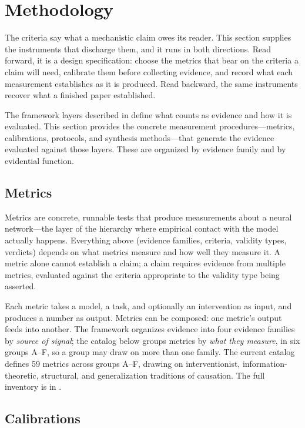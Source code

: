 \documentclass{article}
\begin{document}
\section{Methodology}
\label{sec:methodology}

The criteria say what a mechanistic claim owes its reader. This section supplies the
instruments that discharge them, and it runs in both directions. Read forward, it is a
design specification: choose the metrics that bear on the criteria a claim will need,
calibrate them before collecting evidence, and record what each measurement establishes
as it is produced. Read backward, the same instruments recover what a finished paper
established.

The framework layers described in  define what counts as evidence and how it is evaluated. This section provides the concrete measurement procedures---metrics, calibrations, protocols, and synthesis methods---that generate the evidence evaluated against those layers. These are organized by evidence family and by evidential function.

\subsection{Metrics}
\label{sec:metrics}

Metrics are concrete, runnable tests that produce measurements about a neural network---the layer of the hierarchy where empirical contact with the model actually happens. Everything above (evidence families, criteria, validity types, verdicts) depends on what metrics measure and how well they measure it. A metric alone cannot establish a claim; a claim requires evidence from multiple metrics, evaluated against the criteria appropriate to the validity type being asserted.

Each metric takes a model, a task, and optionally an intervention as input, and produces a number as output. Metrics can be composed: one metric's output feeds into another. The framework organizes evidence into four evidence families by \emph{source of signal}; the catalog below groups metrics by \emph{what they measure}, in six groups A--F, so a group may draw on more than one family. The current catalog defines 59 metrics across groups A--F, drawing on interventionist, information-theoretic, structural, and generalization traditions of causation. The full inventory is in .

\subsection{Calibrations}
\label{sec:calibrations}
\end{document}
